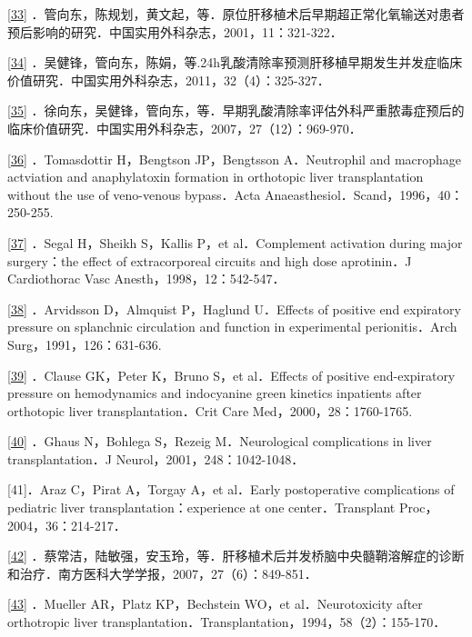 \protect\hyperlink{text00020.htmlux5cux23ch33-19-back}{{[}33{]}}
．管向东，陈规划，黄文起，等．原位肝移植术后早期超正常化氧输送对患者预后影响的研究．中国实用外科杂志，2001，11：321-322．

\protect\hyperlink{text00020.htmlux5cux23ch34-19-back}{{[}34{]}}
．吴健锋，管向东，陈娟，等.24h乳酸清除率预测肝移植早期发生并发症临床价值研究．中国实用外科杂志，2011，32（4）：325-327．

\protect\hyperlink{text00020.htmlux5cux23ch35-19-back}{{[}35{]}}
．徐向东，吴健锋，管向东，等．早期乳酸清除率评估外科严重脓毒症预后的临床价值研究．中国实用外科杂志，2007，27（12）：969-970．

\protect\hyperlink{text00020.htmlux5cux23ch36-19-back}{{[}36{]}}
．Tomasdottir H，Bengtson JP，Bengtsson A．Neutrophil and macrophage
actviation and anaphylatoxin formation in orthotopic liver
transplantation without the use of veno-venous bypass．Acta
Anaeasthesiol．Scand，1996，40：250-255.

\protect\hyperlink{text00020.htmlux5cux23ch37-19-back}{{[}37{]}} ．Segal
H，Sheikh S，Kallis P，et al．Complement activation during major
surgery：the effect of extracorporeal circuits and high dose
aprotinin．J Cardiothorac Vasc Anesth，1998，12：542-547．

\protect\hyperlink{text00020.htmlux5cux23ch38-19-back}{{[}38{]}}
．Arvidsson D，Almquist P，Haglund U．Effects of positive end expiratory
pressure on splanchnic circulation and function in experimental
perionitis．Arch Surg，1991，126：631-636.

\protect\hyperlink{text00020.htmlux5cux23ch39-19-back}{{[}39{]}}
．Clause GK，Peter K，Bruno S，et al．Effects of positive end-expiratory
pressure on hemodynamics and indocyanine green kinetics inpatients after
orthotopic liver transplantation．Crit Care Med，2000，28：1760-1765.

\protect\hyperlink{text00020.htmlux5cux23ch40-19-back}{{[}40{]}} ．Ghaus
N，Bohlega S，Rezeig M．Neurological complications in liver
transplantation．J Neurol，2001，248：1042-1048．

{[}41{]}．Araz C，Pirat A，Torgay A，et al．Early postoperative
complications of pediatric liver transplantation：experience at one
center．Transplant Proc，2004，36：214-217．

\protect\hyperlink{text00020.htmlux5cux23ch42-19-back}{{[}42{]}}
．蔡常洁，陆敏强，安玉玲，等．肝移植术后并发桥脑中央髓鞘溶解症的诊断和治疗．南方医科大学学报，2007，27（6）：849-851．

\protect\hyperlink{text00020.htmlux5cux23ch43-19-back}{{[}43{]}}
．Mueller AR，Platz KP，Bechstein WO，et al．Neurotoxicity after
orthotropic liver
transplantation．Transplantation，1994，58（2）：155-170．

